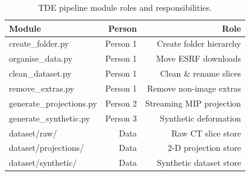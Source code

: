 \begin{table}[htbp]
\caption{TDE pipeline module roles and responsibilities.}
\label{tab:module_roles}
\begin{tabular}{lrr}
\toprule
Module & Person & Role \\
\midrule
create\_folder.py & Person 1 & Create folder hierarchy \\
organise\_data.py & Person 1 & Move ESRF downloads \\
clean\_dataset.py & Person 1 & Clean \& rename slices \\
remove\_extras.py & Person 1 & Remove non-image extras \\
generate\_projections.py & Person 2 & Streaming MIP projection \\
generate\_synthetic.py & Person 3 & Synthetic deformation \\
dataset/raw/ & Data & Raw CT slice store \\
dataset/projections/ & Data & 2-D projection store \\
dataset/synthetic/ & Data & Synthetic dataset store \\
\bottomrule
\end{tabular}
\end{table}
